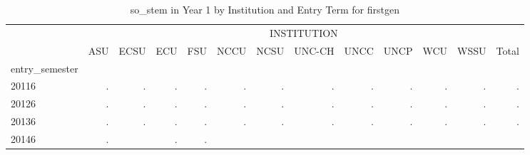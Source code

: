 \begin{table}[!h]
\caption{so\_stem in Year 1 by Institution and Entry Term for firstgen}
\centering
\begin{tabular}{lllllllllllll}
\cline{1-13}
\multicolumn{1}{c}{} &
  \multicolumn{12}{|c}{INSTITUTION} \\
\multicolumn{1}{c}{} &
  \multicolumn{1}{|r}{ASU} &
  \multicolumn{1}{r}{ECSU} &
  \multicolumn{1}{r}{ECU} &
  \multicolumn{1}{r}{FSU} &
  \multicolumn{1}{r}{NCCU} &
  \multicolumn{1}{r}{NCSU} &
  \multicolumn{1}{r}{UNC-CH} &
  \multicolumn{1}{r}{UNCC} &
  \multicolumn{1}{r}{UNCP} &
  \multicolumn{1}{r}{WCU} &
  \multicolumn{1}{r}{WSSU} &
  \multicolumn{1}{r}{Total} \\
\cline{1-13}
\multicolumn{1}{l}{entry\_semester} &
  \multicolumn{1}{|r}{} &
  \multicolumn{1}{r}{} &
  \multicolumn{1}{r}{} &
  \multicolumn{1}{r}{} &
  \multicolumn{1}{r}{} &
  \multicolumn{1}{r}{} &
  \multicolumn{1}{r}{} &
  \multicolumn{1}{r}{} &
  \multicolumn{1}{r}{} &
  \multicolumn{1}{r}{} &
  \multicolumn{1}{r}{} &
  \multicolumn{1}{r}{} \\
\multicolumn{1}{l}{\hspace{1em}20116} &
  \multicolumn{1}{|r}{.} &
  \multicolumn{1}{r}{.} &
  \multicolumn{1}{r}{.} &
  \multicolumn{1}{r}{.} &
  \multicolumn{1}{r}{.} &
  \multicolumn{1}{r}{.} &
  \multicolumn{1}{r}{.} &
  \multicolumn{1}{r}{.} &
  \multicolumn{1}{r}{.} &
  \multicolumn{1}{r}{.} &
  \multicolumn{1}{r}{.} &
  \multicolumn{1}{r}{.} \\
\multicolumn{1}{l}{\hspace{1em}20126} &
  \multicolumn{1}{|r}{.} &
  \multicolumn{1}{r}{.} &
  \multicolumn{1}{r}{.} &
  \multicolumn{1}{r}{.} &
  \multicolumn{1}{r}{.} &
  \multicolumn{1}{r}{.} &
  \multicolumn{1}{r}{.} &
  \multicolumn{1}{r}{.} &
  \multicolumn{1}{r}{.} &
  \multicolumn{1}{r}{.} &
  \multicolumn{1}{r}{.} &
  \multicolumn{1}{r}{.} \\
\multicolumn{1}{l}{\hspace{1em}20136} &
  \multicolumn{1}{|r}{.} &
  \multicolumn{1}{r}{.} &
  \multicolumn{1}{r}{.} &
  \multicolumn{1}{r}{.} &
  \multicolumn{1}{r}{.} &
  \multicolumn{1}{r}{.} &
  \multicolumn{1}{r}{.} &
  \multicolumn{1}{r}{.} &
  \multicolumn{1}{r}{.} &
  \multicolumn{1}{r}{.} &
  \multicolumn{1}{r}{.} &
  \multicolumn{1}{r}{.} \\
\multicolumn{1}{l}{\hspace{1em}20146} &
  \multicolumn{1}{|r}{.} &
  \multicolumn{1}{r}{} &
  \multicolumn{1}{r}{.} &
  \multicolumn{1}{r}{.} &

\end{tabular}
\end{table}

